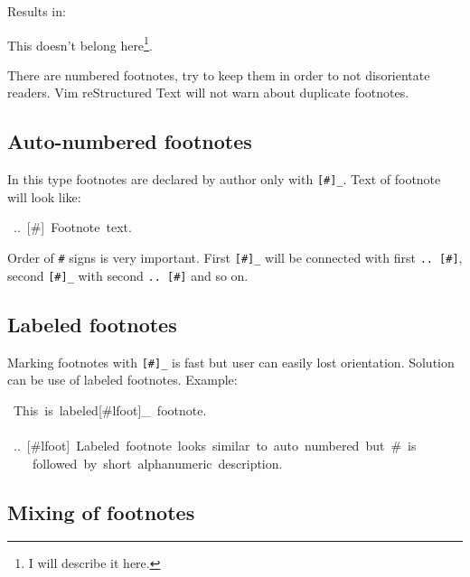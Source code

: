 \documentclass[12pt]{article}
\begin{document}
Results in:

This doesn't belong here\footnote{I will describe it here.
}.

There are numbered footnotes, try to keep them in order to not
disorientate readers. Vim reStructured Text will not warn about duplicate footnotes.

\hypertarget{lauto-numbered-footnotes}{}
\subsection{Auto-numbered footnotes}

In this type footnotes are declared by author only with \texttt{[\#]\_}. Text of
footnote will look like:

\begin{ttfamily}\begin{flushleft}
\mbox{~..~[\#]~Footnote~text.}\\
\end{flushleft}\end{ttfamily}

Order of \texttt{\#} signs is very important. First \texttt{[\#]\_} will be
connected with first \texttt{.. [\#]}, second \texttt{[\#]\_} with second \texttt{.. [\#]}
and so on.

\hypertarget{llabeled-footnotes}{}
\subsection{Labeled footnotes}

Marking footnotes with \texttt{[\#]\_} is fast but user can easily lost orientation.
Solution can be use of labeled footnotes. Example:

\begin{ttfamily}\begin{flushleft}
\mbox{~This~is~labeled[\#lfoot]\_~footnote.}\\
\mbox{}\\
\mbox{~..~[\#lfoot]~Labeled~footnote~looks~similar~to~auto~numbered~but~\#~is}\\
\mbox{~~~~followed~by~short~alphanumeric~description.}\\
\end{flushleft}\end{ttfamily}

\hypertarget{lmixing-of-footnotes}{}
\subsection{Mixing of footnotes}
\end{document}
